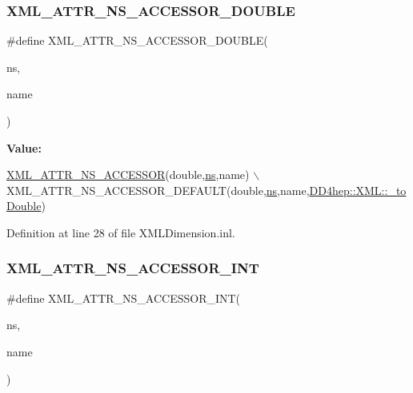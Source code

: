 \subsubsection{\texorpdfstring{X\+M\+L\+\_\+\+A\+T\+T\+R\+\_\+\+N\+S\+\_\+\+A\+C\+C\+E\+S\+S\+O\+R\+\_\+\+D\+O\+U\+B\+LE}{XML\_ATTR\_NS\_ACCESSOR\_DOUBLE}}
{\footnotesize\ttfamily \#define X\+M\+L\+\_\+\+A\+T\+T\+R\+\_\+\+N\+S\+\_\+\+A\+C\+C\+E\+S\+S\+O\+R\+\_\+\+D\+O\+U\+B\+LE(\begin{DoxyParamCaption}\item[{}]{ns,  }\item[{}]{name }\end{DoxyParamCaption})}

{\bfseries Value\+:}
\begin{DoxyCode}
\hyperlink{_x_m_l_dimension_8inl_a712f343791889ac7912b917b64ccb32a}{XML\_ATTR\_NS\_ACCESSOR}(\textcolor{keywordtype}{double},\hyperlink{namespacedd4hep_af8ce9b988119cb2c9b6b7397dbb34e97}{ns},name)                              \(\backslash\)
  XML\_ATTR\_NS\_ACCESSOR\_DEFAULT(\textcolor{keywordtype}{double},\hyperlink{namespacedd4hep_af8ce9b988119cb2c9b6b7397dbb34e97}{ns},name,\hyperlink{group___d_d4_h_e_p___x_m_l_gace8029e843a4c94cf50bd9adc32cd6f6}{DD4hep::XML::\_toDouble})
\end{DoxyCode}


Definition at line 28 of file X\+M\+L\+Dimension.\+inl.

\hypertarget{_x_m_l_dimension_8inl_ad521d34a53e9f1ab96da2b2566438d95}{}\label{_x_m_l_dimension_8inl_ad521d34a53e9f1ab96da2b2566438d95} 
\subsubsection{\texorpdfstring{X\+M\+L\+\_\+\+A\+T\+T\+R\+\_\+\+N\+S\+\_\+\+A\+C\+C\+E\+S\+S\+O\+R\+\_\+\+I\+NT}{XML\_ATTR\_NS\_ACCESSOR\_INT}}
{\footnotesize\ttfamily \#define X\+M\+L\+\_\+\+A\+T\+T\+R\+\_\+\+N\+S\+\_\+\+A\+C\+C\+E\+S\+S\+O\+R\+\_\+\+I\+NT(\begin{DoxyParamCaption}\item[{}]{ns,  }\item[{}]{name }\end{DoxyParamCaption})}

